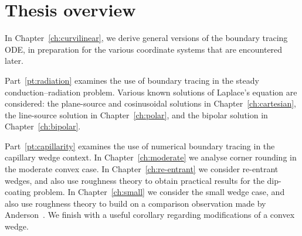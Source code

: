 \section{Thesis overview}

In Chapter~\ref{ch:curvilinear},
we derive general versions of the boundary tracing ODE\@,
in preparation for the various coordinate systems
that are encountered later.

Part~\ref{pt:radiation} examines the use of boundary tracing
in the steady conduction--radiation problem.
Various known solutions of Laplace's equation are considered:
the plane-source and cosinusoidal solutions in Chapter~\ref{ch:cartesian},
the line-source solution in Chapter~\ref{ch:polar},
and the bipolar solution in Chapter~\ref{ch:bipolar}.

Part~\ref{pt:capillarity} examines the use of numerical boundary tracing
in the capillary wedge context.
In Chapter~\ref{ch:moderate}
we analyse corner rounding in the moderate convex case.
In Chapter~\ref{ch:re-entrant}
we consider re-entrant wedges,
and also use roughness theory to obtain practical results
for the dip-coating problem.
In Chapter~\ref{ch:small} we consider the small wedge case,
and also use roughness theory
to build on a comparison observation
made by
Anderson~\cite[Section~7.3.2]{anderson-2002-thesis-boundary-tracing-pdes}.
We finish with a useful corollary
regarding modifications of a convex wedge.
